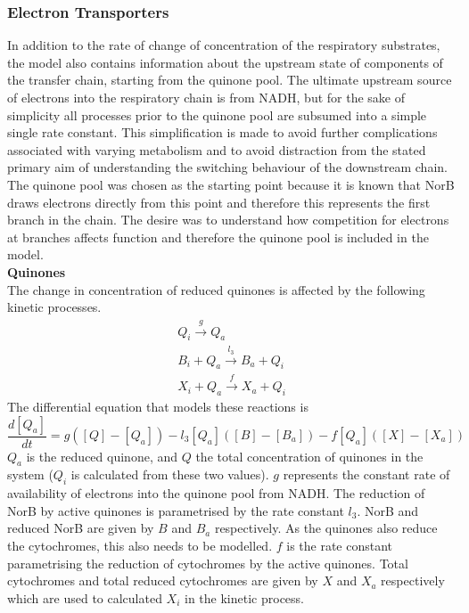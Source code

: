 \subsubsection{Electron Transporters}

In addition to the rate of change of concentration of the respiratory substrates, the model also contains information about the upstream state of components of the transfer chain, starting from the quinone pool. The ultimate upstream source of electrons into the respiratory chain is from NADH, but for the sake of simplicity all processes prior to the quinone pool are subsumed into a simple single rate constant. This simplification is made to avoid further complications associated with varying metabolism and to avoid distraction from the stated primary aim of understanding the switching behaviour of the downstream chain. The quinone pool was chosen as the starting point because it is known that NorB draws electrons directly from this point and therefore this represents the first branch in the chain. The desire was to understand how competition for electrons at branches affects function and therefore the quinone pool is included in the model.\\
{\bf Quinones}\\
The change in concentration of reduced quinones is affected by the following kinetic processes.
\begin{equation*}
\begin{gathered}
Q_i \xrightarrow{g} Q_a\\
B_i + Q_a \xrightarrow{l_3} B_a + Q_i\\
X_i + Q_a \xrightarrow{f} X_a + Q_i
\end{gathered}
\end{equation*}
The differential equation that models these reactions is
\begin{equation}
\frac{d[Q_a]}{dt} = g([Q] - [Q_a]) - l_3[Q_a]([B] - [B_a]) - f[Q_a]([X]-[X_a])
\label{eq:quinones}
\end{equation}
$Q_a$ is the reduced quinone, and $Q$ the total concentration of quinones in the system ($Q_i$ is calculated from these two values). $g$ represents the constant rate of availability of electrons into the quinone pool from NADH. The reduction of NorB by active quinones is parametrised by the rate constant $l_3$. NorB and reduced NorB are given by $B$ and $B_a$ respectively. As the quinones also reduce the cytochromes, this also needs to be modelled. $f$ is the rate constant parametrising the reduction of cytochromes by the active quinones. Total cytochromes and total reduced cytochromes are given by $X$ and $X_a$ respectively which are used to calculated $X_i$ in the kinetic process.\\
